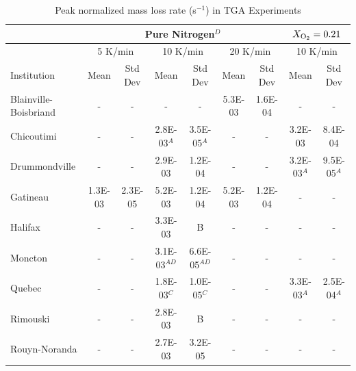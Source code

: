 \documentclass{book}
\begin{document}
\begin{table}[h!]
\caption{Peak normalized mass loss rate (s$^{-1}$) in TGA Experiments}
\label{Table_8}
\begin{center}
\begin{tabular}{|l|cc|cc|cc|cc|}
\hline
                        & \multicolumn{6}{|c|}{Pure Nitrogen$^D$} & \multicolumn{2}{|c|}{$X_{\rm O_2}=0.21$}                                                       \\  \hline
                        & \multicolumn{2}{|c|}{5 K/min} & \multicolumn{2}{|c|}{10 K/min}    & \multicolumn{2}{|c|}{20 K/min} & \multicolumn{2}{|c|}{10 K/min}      \\  \hline
Institution             & Mean        & Std Dev         & Mean           & Std Dev          & Mean       & Std Dev           & Mean        & Std Dev               \\  \hline
Blainville-Boisbriand   & -           & -               & -              & -                & 5.3E-03    & 1.6E-04           & -           & -                     \\
Chicoutimi              & -           & -               & 2.8E-03$^A$    & 3.5E-05$^A$      & -          & -                 & 3.2E-03     & 8.4E-04               \\
Drummondville           & -           & -               & 2.9E-03        & 1.2E-04          & -          & -                 & 3.2E-03$^A$ & 9.5E-05$^A$           \\
Gatineau                & 1.3E-03     & 2.3E-05         & 5.2E-03        & 1.2E-04          & 5.2E-03    & 1.2E-04           & -           & -                     \\
Halifax                 & -           & -               & 3.3E-03        & B                & -          & -                 & -           & -                     \\
Moncton                 & -           & -               & 3.1E-03$^{AD}$ & 6.6E-05$^{AD}$   & -          & -                 & -           & -                     \\
Quebec                  & -           & -               & 1.8E-03$^C$    & 1.0E-05$^C$      & -          & -                 & 3.3E-03$^A$ & 2.5E-04$^A$           \\
Rimouski                & -           & -               & 2.8E-03        & B                & -          & -                 & -           & -                     \\
Rouyn-Noranda           & -           & -               & 2.7E-03        & 3.2E-05          & -          & -                 & -           & -                     \\

\end{tabular}
\end{center}
\end{table}
\end{document}
